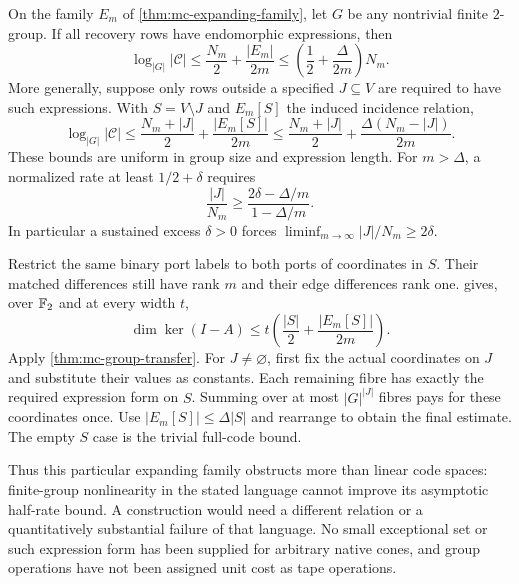 \begin{corollary}
\notformalized
\label{cor:mc-group-codes}
On the family $E_m$ of \cref{thm:mc-expanding-family}, let $G$ be any
nontrivial finite $2$-group. If all recovery rows have endomorphic
expressions, then
\[
 \log_{|G|}|\mathcal C|\le
 \frac{N_m}{2}+\frac{|E_m|}{2m}
 \le\left(\frac12+\frac{\Delta}{2m}\right)N_m.
\]
More generally, suppose only rows outside a specified $J\subseteq V$
are required to have such expressions. With $S=V\setminus J$ and
$E_m[S]$ the induced incidence relation,
\[
 \log_{|G|}|\mathcal C|\le
 \frac{N_m+|J|}{2}+\frac{|E_m[S]|}{2m}
 \le\frac{N_m+|J|}{2}+\frac{\Delta(N_m-|J|)}{2m}.
\]
These bounds are uniform in group size and expression length.
For $m>\Delta$, a normalized rate at least $1/2+\delta$ requires
\[
 \frac{|J|}{N_m}\ge
       \frac{2\delta-\Delta/m}{1-\Delta/m}.
\]
In particular a sustained excess $\delta>0$ forces
$\liminf_{m\to\infty}|J|/N_m\ge2\delta$.
\end{corollary}
\begin{informalproof}
Restrict the same binary port labels to both ports of coordinates in
$S$. Their matched differences still have rank $m$ and their edge
differences rank one.  gives, over $\mathbb{F}_2$
and at every width $t$,
\[
 \dim\ker(I-A)\le t\left(\frac{|S|}{2}
                                      +\frac{|E_m[S]|}{2m}\right).
\]
Apply \cref{thm:mc-group-transfer}. For $J\ne\varnothing$, first
fix the actual coordinates on $J$ and substitute their values as
constants. Each remaining fibre has exactly the required expression
form on $S$. Summing over at most $|G|^{|J|}$ fibres pays for these
coordinates once. Use $|E_m[S]|\le\Delta|S|$ and rearrange to obtain
the final estimate. The empty $S$ case is the trivial full-code bound.
\end{informalproof}

Thus this particular expanding family obstructs more than linear code
spaces: finite-group nonlinearity in the stated language cannot improve
its asymptotic half-rate bound. A construction would need a different
relation or a quantitatively substantial failure of that language.
No small exceptional set or such expression form has been supplied for
arbitrary native cones, and group operations have not been assigned
unit cost as tape operations.
